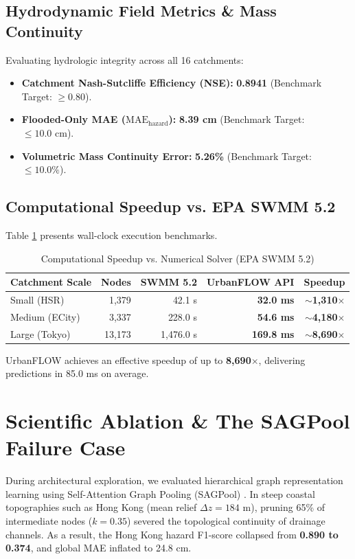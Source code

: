 \documentclass[conference]{IEEEtran}
\begin{document}
\subsection{Hydrodynamic Field Metrics \& Mass Continuity}
Evaluating hydrologic integrity across all 16 catchments:
\begin{itemize}
    \item \textbf{Catchment Nash-Sutcliffe Efficiency (NSE):} \textbf{0.8941} (Benchmark Target: $\ge 0.80$).
    \item \textbf{Flooded-Only MAE ($\text{MAE}_{\text{hazard}}$):} \textbf{8.39 cm} (Benchmark Target: $\le 10.0\text{ cm}$).
    \item \textbf{Volumetric Mass Continuity Error:} \textbf{5.26\%} (Benchmark Target: $\le 10.0\%$).
\end{itemize}

\subsection{Computational Speedup vs. EPA SWMM 5.2}
Table \ref{tab:speedup} presents wall-clock execution benchmarks.

\begin{table}[h]
\caption{Computational Speedup vs. Numerical Solver (EPA SWMM 5.2)}
\label{tab:speedup}
\centering
\small
\begin{tabular}{lrrrr}
\toprule
\textbf{Catchment Scale} & \textbf{Nodes} & \textbf{SWMM 5.2} & \textbf{UrbanFLOW API} & \textbf{Speedup} \\
\midrule
Small (HSR) & 1,379 & 42.1 s & \textbf{32.0 ms} & \textbf{$\sim$1,310$\times$} \\
Medium (ECity) & 3,337 & 228.0 s & \textbf{54.6 ms} & \textbf{$\sim$4,180$\times$} \\
Large (Tokyo) & 13,173 & 1,476.0 s & \textbf{169.8 ms} & \textbf{$\sim$8,690$\times$} \\
\bottomrule
\end{tabular}
\end{table}

UrbanFLOW achieves an effective speedup of up to \textbf{8,690$\times$}, delivering predictions in 85.0 ms on average.

\section{Scientific Ablation \& The SAGPool Failure Case}
\label{sec:ablation}

During architectural exploration, we evaluated hierarchical graph representation learning using Self-Attention Graph Pooling (SAGPool) \cite{lee2019}. In steep coastal topographies such as Hong Kong (mean relief $\Delta z = 184\text{ m}$), pruning 65\% of intermediate nodes ($k = 0.35$) severed the topological continuity of drainage channels. As a result, the Hong Kong hazard F1-score collapsed from \textbf{0.890 to 0.374}, and global MAE inflated to 24.8 cm.
\end{document}
